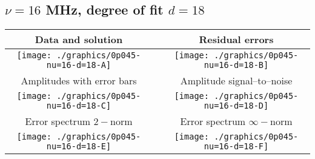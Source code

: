 

% 

\clearpage{}
\break{}

\subsection{$\nu = 16$ MHz, degree of fit $d = 18$}

\begin{table}[h]
    \begin{center}
        \begin{tabular}{ccc}
            Data and solution & \quad & Residual errors \\\hline
            \texttt{[image: ./graphics/0p045-nu=16-d=18-A]} &&
            \texttt{[image: ./graphics/0p045-nu=16-d=18-B]} \\[15pt]
            Amplitudes with error bars && Amplitude signal--to--noise \\\hline
            \texttt{[image: ./graphics/0p045-nu=16-d=18-C]} &&
            \texttt{[image: ./graphics/0p045-nu=16-d=18-D]} \\[15pt]
            Error spectrum $2-$norm && Error spectrum $\infty-$norm \\\hline
            \texttt{[image: ./graphics/0p045-nu=16-d=18-E]} &&
            \texttt{[image: ./graphics/0p045-nu=16-d=18-F]} \\[15pt]
        \end{tabular}
    \end{center}
\label{fig:elev=45, nu=16}
\end{table}



\endinput
